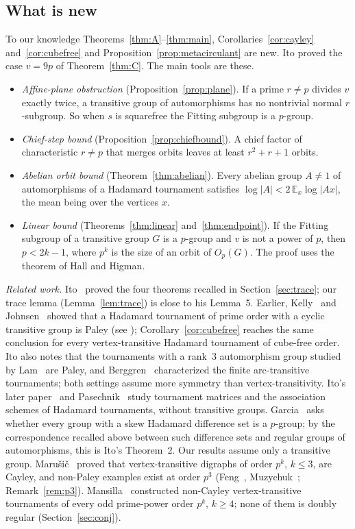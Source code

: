 \documentclass[11pt]{amsart}
\theoremstyle{definition}
\theoremstyle{remark}
\begin{document}
\subsection*{What is new}
To our knowledge Theorems~\ref{thm:A}--\ref{thm:main}, Corollaries~\ref{cor:cayley} and~\ref{cor:cubefree} and Proposition~\ref{prop:metacirculant} are new. Ito proved the case $v=9p$ of Theorem~\ref{thm:C}. The main tools are these.
\begin{itemize}
\item \emph{Affine-plane obstruction} (Proposition~\ref{prop:plane}). If a prime $r\ne p$ divides $v$ exactly twice, a transitive group of automorphisms has no nontrivial normal $r$-subgroup. So when $s$ is squarefree the Fitting subgroup is a $p$-group.
\item \emph{Chief-step bound} (Proposition~\ref{prop:chiefbound}). A chief factor of characteristic $r\ne p$ that merges orbits leaves at least $r^2+r+1$ orbits.
\item \emph{Abelian orbit bound} (Theorem~\ref{thm:abelian}). Every abelian group $A\ne1$ of automorphisms of a Hadamard tournament satisfies $\log|A|<2\,\mathbb{E}_x\log|Ax|$, the mean being over the vertices $x$.
\item \emph{Linear bound} (Theorems~\ref{thm:linear} and~\ref{thm:endpoint}). If the Fitting subgroup of a transitive group $G$ is a $p$-group and $v$ is not a power of $p$, then $p<2k-1$, where $p^k$ is the size of an orbit of $O_p(G)$. The proof uses the theorem of Hall and Higman.
\end{itemize}

\emph{Related work.} Ito~\cite{Ito84} proved the four theorems recalled in Section~\ref{sec:trace}; our trace lemma (Lemma~\ref{lem:trace}) is close to his Lemma~5. Earlier, Kelly~\cite{Kelly} and Johnsen~\cite{Johnsen} showed that a Hadamard tournament of prime order with a cyclic transitive group is Paley (see \cite[p.~37]{Ito84}); Corollary~\ref{cor:cubefree} reaches the same conclusion for every vertex-transitive Hadamard tournament of cube-free order. Ito also notes \cite[p.~37]{Ito84} that the tournaments with a rank~$3$ automorphism group studied by Lam~\cite{Lam} are Paley, and Berggren~\cite[Theorem~A]{Berggren} characterized the finite arc-transitive tournaments; both settings assume more symmetry than vertex-transitivity. Ito's later paper~\cite{Ito90} and Pasechnik~\cite{Pasechnik} study tournament matrices and the association schemes of Hadamard tournaments, without transitive groups. Garcia~\cite[Conjecture~2.9]{Garcia} asks whether every group with a skew Hadamard difference set is a $p$-group; by the correspondence recalled above between such difference sets and regular groups of automorphisms, this is Ito's Theorem~2. Our results assume only a transitive group. Maru\v{s}i\v{c}~\cite{Marusic} proved that vertex-transitive digraphs of order $p^k$, $k\le3$, are Cayley, and non-Paley examples exist at order $p^3$ (Feng~\cite{Feng}, Muzychuk~\cite{Muzychuk}; Remark~\ref{rem:p3}). Mansilla~\cite{Mansilla} constructed non-Cayley vertex-transitive tournaments of every odd prime-power order $p^k$, $k\ge4$; none of them is doubly regular (Section~\ref{sec:conj}).
\end{document}
